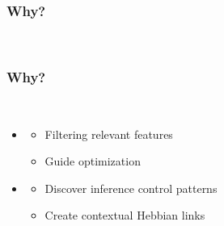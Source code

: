 \documentclass[aspectratio=169]{beamer}
\begin{document}
\begin{frame}
  \frametitle{Why?}



  \\[1cm]


\end{frame}

\begin{frame}
  \frametitle{Why?}


  \\[1cm]
  
  \begin{itemize}
  \item \color{red}{Reasoning for meta-learning}
    \begin{itemize}
    \item Filtering relevant features
    \item Guide optimization
    \end{itemize}
  \item \color{red}{Learning for meta-reasoning}
    \begin{itemize}
    \item Discover inference control patterns
    \item Create contextual Hebbian links
    \end{itemize}
  \end{itemize}

\end{frame}
\end{document}
